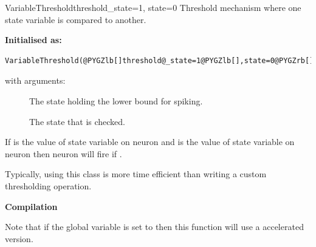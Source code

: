 \documentclass[letterpaper,10pt,english]{manual}
\begin{document}
\hypertarget{brian.VariableThreshold}{}\begin{classdesc}{VariableThreshold}{threshold\_state=1, state=0}
Threshold mechanism where one state variable is compared to another.

\textbf{Initialised as:}

\begin{Verbatim}[commandchars=@\[\]]
VariableThreshold(@PYGZlb[]threshold@_state=1@PYGZlb[],state=0@PYGZrb[]@PYGZrb[])
\end{Verbatim}

with arguments:
\begin{description}
\item[]
The state holding the lower bound for spiking.

\item[]
The state that is checked.

\end{description}

If  is the value of state variable  on neuron
 and  is the value of state variable  on neuron
 then neuron  will fire if .

Typically, using this class is more time efficient than writing
a custom thresholding operation.

\textbf{Compilation}

Note that if the global variable  is set to 
then this function will use a  accelerated version.
\end{classdesc}
\end{document}
